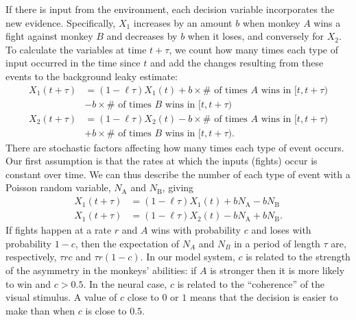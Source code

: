 \documentclass{pnastwo}
\begin{document}
\begin{article}
If there is input from the environment, each decision variable incorporates the new evidence.  Specifically,  $X_1$ increases by an amount $b$ when monkey $A$ wins a fight against monkey $B$ and decreases by $b$ when it loses, and conversely for $X_2$.  To calculate the variables at time $t+\tau$, we  count how many times each type of input occurred in the time since $t$ and add the changes resulting from these events to the background leaky estimate:
\begin{align*}
X_1(t+\tau)&=(1-\ell\tau)X_1(t)+b\times\# \text{ of times $A$  wins in }[t,t+\tau)\\&-b\times\# \text{ of times $B$ wins in }[t,t+\tau)
\\ X_2(t+\tau)&=(1-\ell\tau)X_2(t)-b\times\# \text{ of times $A$ wins in }[t,t+\tau)\\&+b\times\# \text{ of times $B$ wins in }[t,t+\tau). 
\end{align*}
There are stochastic factors affecting how many times each type of event occurs. Our first assumption is that the rates at which the inputs (fights) occur is constant over time.  We can thus describe the number of each type of event with a Poisson random variable, $N_\text{A}$ and $N_\text{B}$, giving 
\begin{align*}
X_1(t+\tau)&=(1-\ell\tau)X_1(t)+bN_\text{A}-bN_\text{B}
\\ X_1(t+\tau)&=(1-\ell\tau)X_2(t)-bN_\text{A}+bN_\text{B}.
\end{align*}
If fights happen at a rate $r$ and $A$ wins with probability $c$ and loses with probability $1-c$, then the expectation of $N_A$ and $N_B$ in a period of length $\tau$ are, respectively, $\tau r c$ and $\tau r(1-c)$. In our model system, $c$ is related to the strength of the asymmetry in the monkeys' abilities: if $A$ is stronger then it is more likely to win and $c>0.5$. In the neural case, $c$ is related to the ``coherence'' of the visual stimulus.  A value of $c$ close to $0$ or $1$ means that the decision is easier to make than when $c$ is close to $0.5$.


\end{article}
\end{document}
